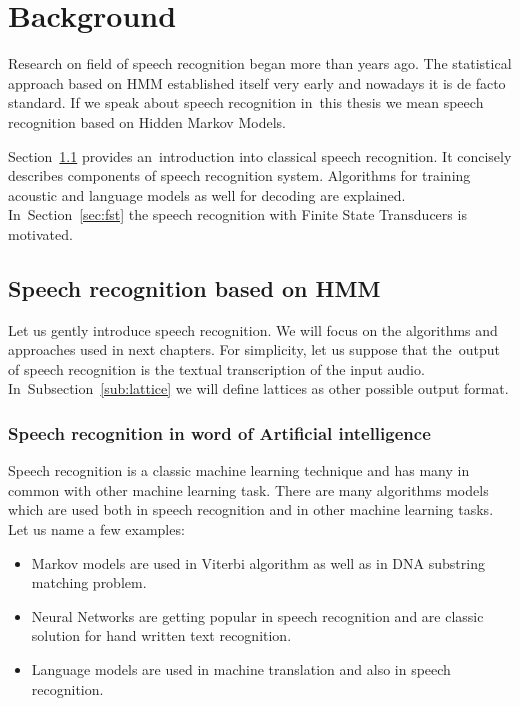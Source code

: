 \chapter{Background}
\label{cha:background}

% 
% 

Research on field of speech recognition began more than  years ago. The statistical approach based on \ac{HMM} established itself very early and nowadays it is de facto standard. If we speak about speech recognition in~this thesis we mean speech recognition based on Hidden Markov Models. 

Section~\ref{sec:general_introduction} provides an~introduction into classical speech recognition. It concisely describes components of speech recognition system. Algorithms for training acoustic and language models as well for decoding are explained. In~Section~\ref{sec:fst} the speech recognition with Finite State Transducers is motivated.

\section{Speech recognition based on \ac{HMM}} 
\label{sec:general_introduction}
Let us gently introduce speech recognition. We will focus on the algorithms and approaches used in next chapters. For simplicity,
let us suppose that the~output of speech recognition is the textual transcription of the input audio. In~Subsection~\ref{sub:lattice} we will define
lattices as other possible output format.



\subsection*{Speech recognition in word of Artificial intelligence}
\label{sub:intro_ml}
Speech recognition is a classic machine learning technique and has many in common with other machine learning task. There are many algorithms models which are used both in speech recognition and in other machine learning tasks.
Let us name a few examples:
\begin{itemize}
    \item Markov models are used in Viterbi algorithm as well as in \ac{DNA} substring matching problem.
    \item Neural Networks are getting popular in speech recognition and are classic solution for hand written text recognition.
    \item Language models are used in machine translation and also in speech recognition. 
\end{itemize}

